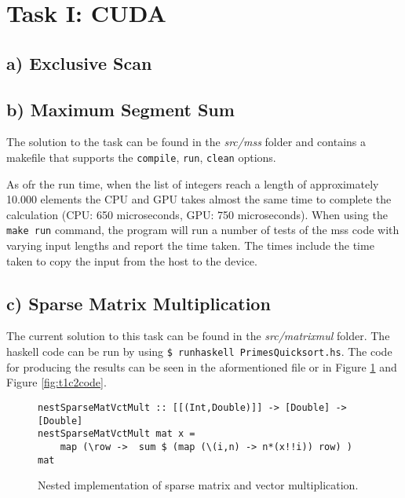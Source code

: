 \section{Task I: CUDA}

\subsection{a) Exclusive Scan}

\subsection{b) Maximum Segment Sum}

The solution to the task can be found in the \textit{src/mss} folder and
contains a makefile that supports the \texttt{compile}, \texttt{run},
\texttt{clean} options.

As ofr the run time, when the list of integers reach a length of approximately
10.000 elements the CPU and GPU takes almost the same time to complete the
calculation (CPU: 650 microseconds, GPU: 750 microseconds). When using the
\texttt{make run} command, the program will run a number of tests of the mss
code with varying input lengths and report the time taken. The times include the
time taken to copy the input from the host to the device.

\subsection{c) Sparse Matrix Multiplication}

The current solution to this task can be found in the
\textit{src/matrixmul} folder. The haskell code can be run by using
\texttt{\$ runhaskell PrimesQuicksort.hs}. The code for producing the results
can be seen in the aformentioned file or in Figure \ref{fig:t1c1code} and Figure
\ref{fig:t1c2code}.

\begin{figure}[H]
    \begin{lstlisting}
nestSparseMatVctMult :: [[(Int,Double)]] -> [Double] -> [Double]
nestSparseMatVctMult mat x =
    map (\row ->  sum $ (map (\(i,n) -> n*(x!!i)) row) ) mat
    \end{lstlisting}
    \caption{Nested implementation of sparse matrix and vector multiplication.}
    \label{fig:t1c1code}
\end{figure}

